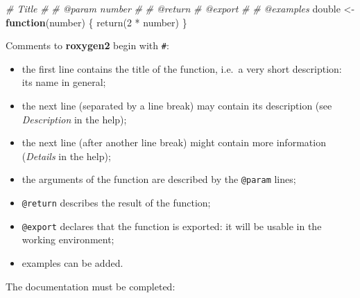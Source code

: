 \documentclass[
  12pt,
  american,
  a4paper,
  extrafontsizes,onecolumn,openright
  ]{memoir}
\newenvironment{Shaded}{\begin{snugshade}}{\end{snugshade}}
\newcommand{\CommentTok}[1]{\textcolor[rgb]{0.56,0.35,0.01}{\textit{#1}}}
\newcommand{\ControlFlowTok}[1]{\textcolor[rgb]{0.13,0.29,0.53}{\textbf{#1}}}
\newcommand{\DecValTok}[1]{\textcolor[rgb]{0.00,0.00,0.81}{#1}}
\newcommand{\FunctionTok}[1]{\textcolor[rgb]{0.00,0.00,0.00}{#1}}
\newcommand{\NormalTok}[1]{#1}
\newcommand{\OtherTok}[1]{\textcolor[rgb]{0.56,0.35,0.01}{#1}}
\newcommand{\SpecialCharTok}[1]{\textcolor[rgb]{0.00,0.00,0.00}{#1}}
\providecommand{\tightlist}{%
  \setlength{\itemsep}{0pt}\setlength{\parskip}{0pt}}
\begin{document}
\scriptsize

\begin{Shaded}
\begin{Highlighting}[]
\CommentTok{\#\textquotesingle{} Title}
\CommentTok{\#\textquotesingle{}}
\CommentTok{\#\textquotesingle{} @param number }
\CommentTok{\#\textquotesingle{}}
\CommentTok{\#\textquotesingle{} @return}
\CommentTok{\#\textquotesingle{} @export}
\CommentTok{\#\textquotesingle{}}
\CommentTok{\#\textquotesingle{} @examples}
\NormalTok{double }\OtherTok{\textless{}{-}} \ControlFlowTok{function}\NormalTok{(number) \{}
    \FunctionTok{return}\NormalTok{(}\DecValTok{2} \SpecialCharTok{*}\NormalTok{ number)}
\NormalTok{\}}
\end{Highlighting}
\end{Shaded}

\normalsize

Comments to \textbf{roxygen2} begin with \texttt{\#\textquotesingle{}}:

\begin{itemize}
\tightlist
\item
  the first line contains the title of the function, i.e.~a very short description: its name in general;
\item
  the next line (separated by a line break) may contain its description (see \emph{Description} in the help);
\item
  the next line (after another line break) might contain more information (\emph{Details} in the help);
\item
  the arguments of the function are described by the \texttt{@param} lines;
\item
  \texttt{@return} describes the result of the function;
\item
  \texttt{@export} declares that the function is exported: it will be usable in the working environment;
\item
  examples can be added.
\end{itemize}

The documentation must be completed:

\scriptsize
\end{document}
